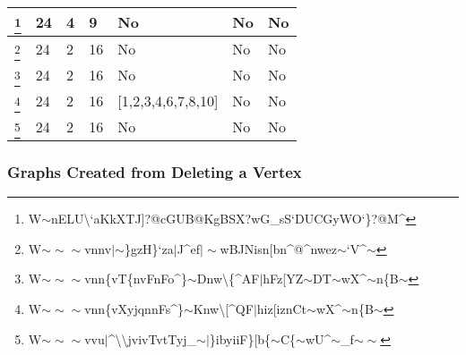 \documentclass[12pt]{article}
\theoremstyle{parenbold}
\begin{document}
\begin{center}
\begin{minipage}{\textwidth}
\begin{tabular}{ |p{1cm}|p{1.5cm}|p{0.5cm}|p{1.5cm}|p{2.7cm}|p{2cm}|p{1cm}| }
 \hline
 \footnote{W$\sim$nELU\textbackslash{}`aKkXTJ]?@cGUB@KgBSX?wG\_sS`DUCGyWO`\}?@M\^{}\label{graph15}} & 24 & 4 & 9 & No & No & No\\
 \hline
 \footnote{W$\sim\sim\sim$vnnv$\vert$$\sim$\}gzH\}`za$\vert$J\^{}ef$\vert\sim$wBJNisn[bn\^{}@\^{}nwez$\sim$`V\^{}$\sim$\label{graph16}} & 24 & 2 & 16 & No & No & No\\
 \hline
 \footnote{W$\sim\sim\sim$vnn\{vT\{nvFnFo\^{}\}$\sim$Dnw\textbackslash{}\{\^{}AF$\vert$hFz[YZ$\sim$DT$\sim$wX\^{}$\sim$n\{B$\sim$\label{graph17}} & 24 & 2 & 16 & No & No & No\\
 \hline
 \footnote{W$\sim\sim\sim$vnn\{vXyjqnnFs\^{}\}$\sim$Knw\textbackslash{}[\^{}QF$\vert$hiz[iznCt$\sim$wX\^{}$\sim$n\{B$\sim$\label{graph18}} & 24 & 2 & 16 & [1,2,3,4,6,7,8,10] & No & No\\
 \hline
 \footnote{W$\sim\sim\sim$vvu$\vert$\^{}\textbackslash{}\textbackslash{}jvivTvtTyj\_$\sim\vert$\}ibyiiF\}[b\{$\sim$C\{$\sim$wU\^{}$\sim$\_f$\sim\sim$\label{graph19}} & 24 & 2 & 16 & No & No & No\\
 \hline
\end{tabular}
\end{minipage}
\end{center}

\subsubsection{Graphs Created from Deleting a Vertex}
\end{document}
